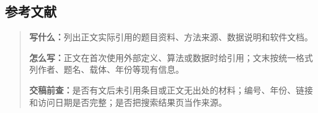 \subsection{参考文献}
\begin{quote}\small
\noindent\textbf{\color{inkblue}写什么：}列出正文实际引用的题目资料、方法来源、数据说明和软件文档。\par
\noindent\textbf{\color{inkblue}怎么写：}正文在首次使用外部定义、算法或数据时给引用；文末按统一格式列作者、题名、载体、年份等现有信息。\par
\noindent\textbf{\color{inkblue}交稿前查：}是否有文后未引用条目或正文无出处的材料；编号、年份、链接和访问日期是否完整；是否把搜索结果页当作来源。
\end{quote}

